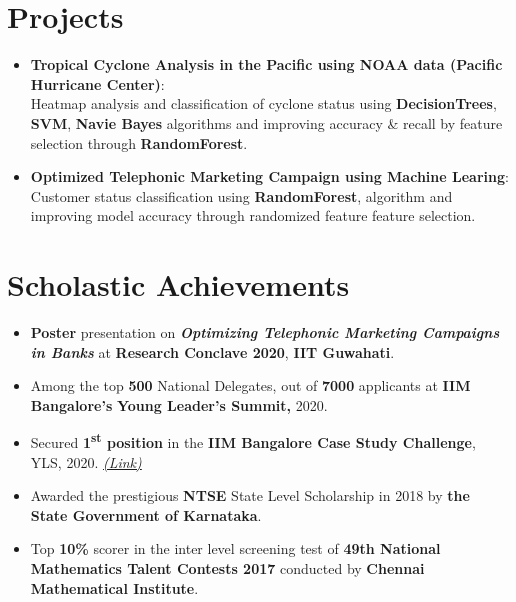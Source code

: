 \documentclass[a4paper,20pt]{article}
\begin{document}
\section{Projects}
\vspace{1pt}
\begin{itemize}[leftmargin=*]
\item {\textbf{Tropical Cyclone Analysis in the Pacific using NOAA data (Pacific Hurricane Center)}:
\vspace{1pt}\\Heatmap analysis and classification of cyclone status using \textbf{\small{DecisionTrees}}, \textbf{\small{SVM}}, \textbf{\small{Navie Bayes}} algorithms and improving accuracy \& recall by feature selection through \textbf{\small{RandomForest}}\href{https://drive.google.com/file/d/1xKNpHQeeeq19CEKN4szinfYQpywduRGa/view?usp=sharing}{}. }
\vspace{-5pt}

\item {\textbf{Optimized Telephonic Marketing Campaign using Machine Learing}:
\vspace{1pt}\\Customer status classification using \textbf{\small{RandomForest}}, algorithm and improving model accuracy through randomized feature feature selection.}
\vspace{-5.5pt}

\end{itemize}
\section{Scholastic Achievements}
\begin{itemize}[leftmargin=*]
\item {\textbf{Poster} presentation on \textbf{\emph{Optimizing Telephonic Marketing Campaigns in Banks}} at \textbf{Research Conclave 2020}, \textbf{IIT Guwahati}.}
\vspace{-5pt}
\item {Among the top \textbf{500} National Delegates, out of \textbf{7000} applicants at \textbf{IIM Bangalore's} \textbf{Young Leader's Summit,} 2020.}
\vspace{-5pt}
\item {Secured \textbf{1\textsuperscript{st} position} in the \textbf{IIM Bangalore Case Study Challenge}, YLS, 2020. \href{https://drive.google.com/file/d/1jTtiIa1Z_woCmvoWQr_THhLtWkNk3Jcj/view?usp=sharing}{\color{ceruleanblue}\emph{(Link)}} }
\vspace{-5pt}
\item {Awarded the prestigious \textbf{NTSE} State Level Scholarship in 2018 by \textbf{the State Government of Karnataka}.}
\vspace{-5pt}
\item {Top \textbf{10\%} scorer in the inter level screening test of \textbf{49th National Mathematics Talent Contests 2017} conducted by \textbf{Chennai Mathematical Institute}.}
\vspace{-5pt}
\end{itemize}
\end{document}
